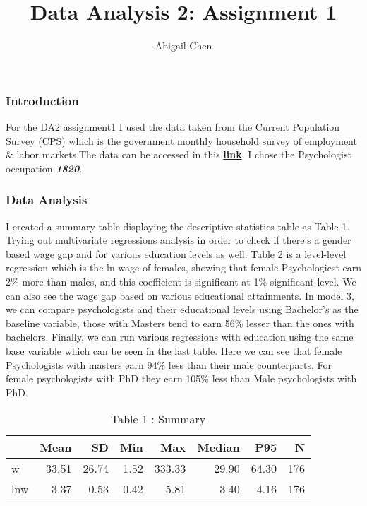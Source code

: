 \documentclass[
]{article}
\title{Data Analysis 2: Assignment 1}
\author{Abigail Chen}
\date{}
\begin{document}
\maketitle

\hypertarget{introduction}{%
\subsubsection{Introduction}\label{introduction}}

For the DA2 assignment1 I used the data taken from the Current
Population Survey (CPS) which is the government monthly household survey
of employment \& labor markets.The data can be accessed in this
\href{https://osf.io/4ay9x/download}{\textbf{link}}. I chose the
Psychologist occupation \emph{\textbf{1820}}.

\hypertarget{data-analysis}{%
\subsubsection{Data Analysis}\label{data-analysis}}

I created a summary table displaying the descriptive statistics table as
Table 1. Trying out multivariate regressions analysis in order to check
if there's a gender based wage gap and for various education levels as
well. Table 2 is a level-level regression which is the ln wage of
females, showing that female Psychologiest earn 2\% more than males, and
this coefficient is significant at 1\% significant level. We can also
see the wage gap based on various educational attainments. In model 3,
we can compare psychologists and their educational levels using
Bachelor's as the baseline variable, those with Masters tend to earn
56\% lesser than the ones with bachelors. Finally, we can run various
regressions with education using the same base variable which can be
seen in the last table. Here we can see that female Psychologists with
masters earn 94\% less than their male counterparts. For female
psychologists with PhD they earn 105\% less than Male psychologists with
PhD.

\begin{table}

\caption{\label{tab:unnamed-chunk-4}Table 1 : Summary}
\centering
\begin{tabular}[t]{lrrrrrrr}
\toprule
  & Mean & SD & Min & Max & Median & P95 & N\\
\midrule
w & \num{33.51} & \num{26.74} & \num{1.52} & \num{333.33} & \num{29.90} & \num{64.30} & 176\\
lnw & \num{3.37} & \num{0.53} & \num{0.42} & \num{5.81} & \num{3.40} & \num{4.16} & 176\\
\bottomrule
\end{tabular}
\end{table}
\end{document}
